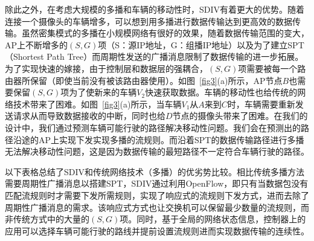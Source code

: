 除此之外，在考虑大规模的多播和车辆的移动性时，SDIV有着更大的优势。随着连接一个摄像头的车辆增多，可以想到用多播进行数据传输达到更高效的数据传输。虽然密集模式的多播在小规模网络有很好的效果，随着数据传输范围的变大，AP上不断增多的$(S,G)$项（S：源IP地址，G：组播IP地址）以及为了建立SPT（Shortest Path Tree）而周期性发送的广播消息限制了数据传输的进一步拓展。为了实现快速的嫁接，由于控制层和数据层的强耦合，$(S,G)$项需要被每一个路由器所保留（即使当前没有被该路由器使用）。如图~\ref{fig3}(a)所示，AP节点$B$也需要保留$(S,G)$项为了使新来的车辆$V_{2}$快速获取数据。车辆的移动性也给传统的网络技术带来了困难。如图~\ref{fig3}(a)所示，当车辆$V_{1}$从$A$来到$C$时，车辆需要重新发送请求从而导致数据接收的中断，同时也给$D$节点的摄像头带来了困难。在我们的设计中，我们通过预测车辆可能行驶的路径解决移动性问题。我们会在预测出的路径沿途的AP上实现下发实现多播的流规则。而沿着SPT的数据传输路径进行多播无法解决移动性问题，这是因为数据传输的最短路径不一定符合车辆行驶的路径。


以下表格总结了SDIV和传统网络技术（多播）的优劣势比较。相比传统多播方法需要周期性广播消息以搭建SPT，SDIV通过利用OpenFlow，即只有当数据包没有匹配流规则时才需要下发所需规则，实现了响应式的流规则下发方式，进而去除了周期性广播消息的需求。该响应式方式也让交换机可以保留最少数量的流规则，而非传统方式中的大量的$(S,G)$项。同时，基于全局的网络状态信息，控制器上的应用可以选择车辆可能行驶的路线并提前设置流规则进而实现数据传输的连续性。


